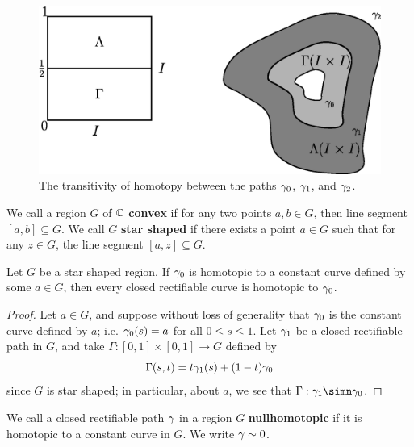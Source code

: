 \begin{figure}[h]
    \centering
    \includegraphics[scale=0.5]{Figures/Chapter4/homotopy.eps}
    \caption{The transitivity of homotopy between the paths $\gamma_0$, $\gamma_1$, and
    $\gamma_2$.}
    \label{figure_4.3}
\end{figure}

\begin{definition}
    We call a region $G$ of  $\mathbb{C}$  \textbf{convex} if for any two points $a,b
    \in G$, then line segment  $[a,b] \subseteq G$. We call $G$  \textbf{star
    shaped} if there exists a point $a \in G$ such that for any  $z \in G$, the
    line segment $[a,z] \subseteq G$.
\end{definition}

\begin{lemma}\label{4.6.2}
    Let $G$ be a star shaped region. If  $\gamma_0$ is homotopic to a constant curve
    defined by some  $a \in G$, then every closed rectifiable curve is homotopic
    to  $\gamma_0$.
\end{lemma}
\begin{proof}
    Let $a \in G$, and suppose without loss of generality that  $\gamma_0$ is the
    constant curve defined by $a$; i.e.  $\gamma_0(s)=a$ for all $0 \leq s \leq 1$.
    Let  $\gamma_1$ be a closed rectifiable path in $G$, and take $\Gamma:[0,1]
    \times [0,1] \xrightarrow{} G$ defined by
    \begin{equation*}
        \Gamma(s,t)=t\gamma_1(s)+(1-t)\gamma_0
    \end{equation*}
    since $G$ is star shaped; in particular, about  $a$, we see that  $\Gamma:
    \y_1 \simn \y_0$.
\end{proof}

\begin{definition}
    We call a closed rectifiable path $\gamma$ in a region $G$
    \textbf{nullhomotopic} if it is homotopic to a constant curve in $G$. We
    write  $\gamma \sim 0$.
\end{definition}

